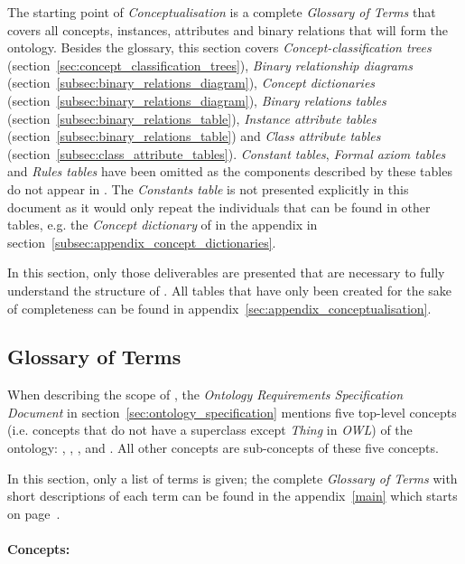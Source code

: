 The starting point of \emph{Conceptualisation} is a complete \emph{Glossary of Terms} that covers all concepts, instances, attributes and binary relations that will form the ontology. Besides the glossary, this section covers \emph{Concept-classification trees} (section~\ref{sec:concept_classification_trees}), \emph{Binary relationship diagrams} (section~\ref{subsec:binary_relations_diagram}), \emph{Concept dictionaries} (section~\ref{subsec:binary_relations_diagram}), \emph{Binary relations tables} (section~\ref{subsec:binary_relations_table}), \emph{Instance attribute tables} (section~\ref{subsec:binary_relations_table}) and \emph{Class attribute tables} (section~\ref{subsec:class_attribute_tables}). \emph{Constant tables}, \emph{Formal axiom tables} and \emph{Rules tables} have been omitted as the components described by these tables do not appear in \thinkhomeweather. The \emph{Constants table} is not presented explicitly in this document as it would only repeat the individuals that can be found in other tables, e.g. the \emph{Concept dictionary} of  in the appendix in section~\ref{subsec:appendix_concept_dictionaries}.

In this section, only those deliverables are presented that are necessary to fully understand the structure of \thinkhomeweather. All tables that have only been created for the sake of completeness can be found in appendix~\ref{sec:appendix_conceptualisation}.

\subsection{Glossary of Terms}
\label{sec:ontology_glossary}

When describing the scope of \thinkhomeweather, the \emph{Ontology Requirements Specification Document} in section~\ref{sec:ontology_specification} mentions five top-level concepts (i.e. concepts that do not have a superclass except \emph{Thing} in \emph{OWL}) of the ontology: , , , and . All other concepts are sub-concepts of these five concepts.

In this section, only a list of terms is given; the complete \emph{Glossary of Terms} with short descriptions of each term can be found in the appendix~\ref{main} which starts on page~\pageref{main}.

\paragraph{Concepts:}

